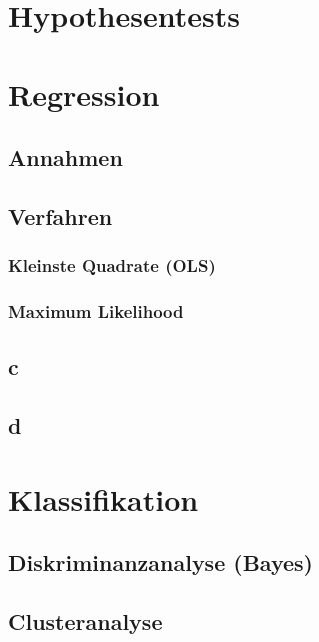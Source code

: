 \documentclass[10pt]{article}
\begin{document}
\section{Hypothesentests}




\section{Regression}

\subsection{Annahmen}

\subsection{Verfahren}
\subsubsection{Kleinste Quadrate (OLS)}
\subsubsection{Maximum Likelihood}

\subsection{c}

\subsection{d}




\section{Klassifikation}

\subsection{Diskriminanzanalyse (Bayes)}

\subsection{Clusteranalyse}
\end{document}
